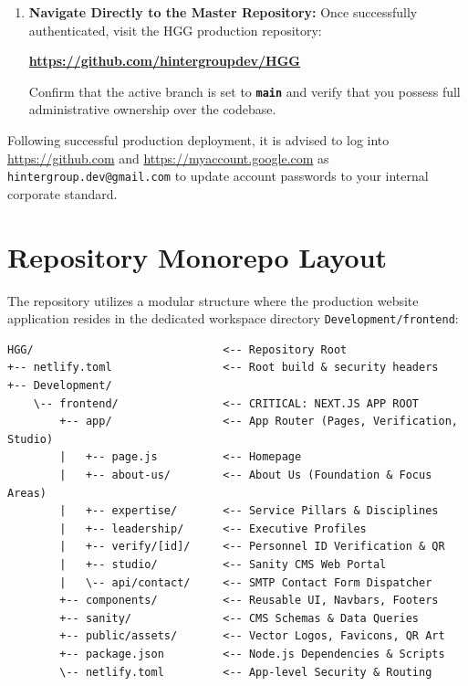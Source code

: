 \documentclass[11pt,a4paper,oneside]{book}
\begin{document}
\begin{enumerate}[leftmargin=*,label=\textbf{Step \arabic*:}]
  \item \textbf{Navigate Directly to the Master Repository:}
    Once successfully authenticated, visit the HGG production repository:
    \begin{center}
      \Large\bfseries\url{https://github.com/hintergroupdev/HGG}
    \end{center}
    Confirm that the active branch is set to \textbf{\texttt{main}} and verify that you possess full administrative ownership over the codebase.
\end{enumerate}

\begin{goldbox}
Following successful production deployment, it is advised to log into \url{https://github.com} and \url{https://myaccount.google.com} as \texttt{hintergroup.dev@gmail.com} to update account passwords to your internal corporate standard.
\end{goldbox}

\section{Repository Monorepo Layout}
The repository utilizes a modular structure where the production website application resides in the dedicated workspace directory \texttt{Development/frontend}:

\begin{lstlisting}
HGG/                             <-- Repository Root
+-- netlify.toml                 <-- Root build & security headers
+-- Development/
    \-- frontend/                <-- CRITICAL: NEXT.JS APP ROOT
        +-- app/                 <-- App Router (Pages, Verification, Studio)
        |   +-- page.js          <-- Homepage
        |   +-- about-us/        <-- About Us (Foundation & Focus Areas)
        |   +-- expertise/       <-- Service Pillars & Disciplines
        |   +-- leadership/      <-- Executive Profiles
        |   +-- verify/[id]/     <-- Personnel ID Verification & QR
        |   +-- studio/          <-- Sanity CMS Web Portal
        |   \-- api/contact/     <-- SMTP Contact Form Dispatcher
        +-- components/          <-- Reusable UI, Navbars, Footers
        +-- sanity/              <-- CMS Schemas & Data Queries
        +-- public/assets/       <-- Vector Logos, Favicons, QR Art
        +-- package.json         <-- Node.js Dependencies & Scripts
        \-- netlify.toml         <-- App-level Security & Routing
\end{lstlisting}
\end{document}
